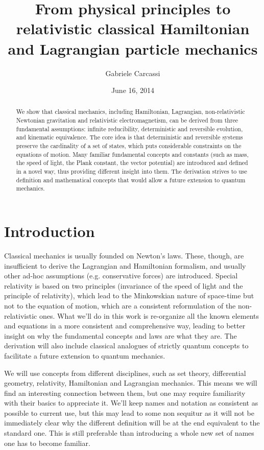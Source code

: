 \documentclass[aps,pra,10pt,twocolumn,floatfix,nofootinbib]{revtex4-1}
\theoremstyle{definition}
\begin{document}
\title{From physical principles to relativistic classical Hamiltonian and Lagrangian particle mechanics}
\author{Gabriele Carcassi}
\date{June 16, 2014}

\begin{abstract}
We show that classical mechanics, including Hamiltonian, Lagrangian, non-relativistic Newtonian gravitation and relativistic electromagnetism, can be derived from three fundamental assumptions: infinite reducibility, deterministic and reversible evolution, and kinematic equivalence. The core idea is that deterministic and reversible systems preserve the cardinality of a set of states, which puts considerable constraints on the equations of motion. Many familiar fundamental concepts and constants (such as mass, the speed of light, the Plank constant, the vector potential) are introduced and defined in a novel way, thus providing different insight into them. The derivation strives to use definition and mathematical concepts that would allow a future extension to quantum mechanics.\end{abstract}
\maketitle

\section{Introduction}


Classical mechanics is usually founded on Newton's laws. These, though, are insufficient to derive the Lagrangian and Hamiltonian formalism, and usually other ad-hoc assumptions (e.g. conservative forces) are introduced. Special relativity is based on two principles (invariance of the speed of light and the principle of relativity), which lead to the Minkowskian nature of space-time but not to the equation of motion, which are a consistent reformulation of the non-relativistic ones. What we'll do in this work is re-organize all the known elements and equations in a more consistent and comprehensive way, leading to better insight on why the fundamental concepts and laws are what they are. The derivation will also include classical analogues of strictly quantum concepts to facilitate a future extension to quantum mechanics.

We will use concepts from different disciplines, such as set theory, differential geometry, relativity, Hamiltonian and Lagrangian mechanics. This means we will find an interesting connection between them, but one may require familiarity with their basics to appreciate it. We'll keep names and notation as consistent as possible to current use, but this may lead to some non sequitur as it will not be immediately clear why the different definition will be at the end equivalent to the standard one. This is still preferable than introducing a whole new set of names one has to become familiar.
\end{document}
